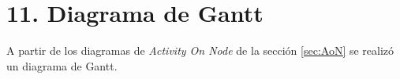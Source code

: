 \documentclass[
11pt%
]{charter}
\begin{document}


\section{11. Diagrama de Gantt}
\label{sec:gantt}

A partir de los diagramas de \emph{Activity On Node} de la sección \ref{sec:AoN} se realizó un diagrama de Gantt.\\

\end{document}
